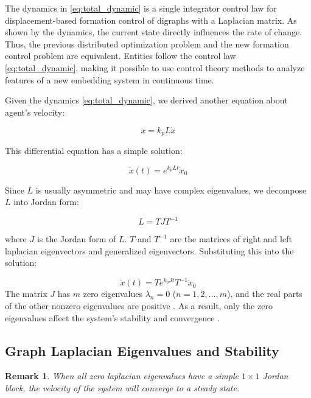 \documentclass[letterpaper, 10 pt, conference]{ieeeconf}  %
\newtheorem{remark}{Remark}
\begin{document}
The dynamics in \eqref{eq:total_dynamic} is a single integrator control law for displacement-based formation control of digraphs with a Laplacian matrix. As shown by the dynamics, the current state directly influences the rate of change. Thus, the previous distributed optimization problem and the new formation control problem are equivalent. Entities follow the control law \eqref{eq:total_dynamic}, making it possible to use control theory methods to analyze features of a new embedding system in continuous time.

Given the dynamics \eqref{eq:total_dynamic}, we derived another equation about agent's velocity:

\begin{equation}
    \ddot{x} = k_p L \dot{x}
    \label{eq:2dot}
\end{equation}

\noindent This differential equation has a simple solution:

\[ 
    \dot{x}(t) = e^{k_p Lt} \dot{x}_0 
\]

\noindent Since \( L \) is usually asymmetric and may have complex eigenvalues, we decompose \( L \) into Jordan form:

\[ 
    L = T J T^{-1} 
\]

\noindent where \( J \) is the Jordan form of \( L \). \( T \) and \(T^{-1}\) are the matrices of right and left laplacian eigenvectors and generalized eigenvectors. Substituting this into the solution:


\begin{equation}
    \dot{x}(t) = T e^{k_p J t} T^{-1} \dot{x}_0 
    \label{eq:jordan_decom}
\end{equation}
\noindent The matrix \( J \) has \( m \) zero eigenvalues \( \lambda_n = 0 \) (\( n = 1,2,...,m \)), and the real parts of the other nonzero eigenvalues are positive \cite{mirzaev_laplacian_2013}. As a result, only the zero eigenvalues affect the system's stability and convergence \cite{mesbahi_graph_2010}. 


\subsection{Graph Laplacian Eigenvalues and Stability}
\begin{remark}
    When all zero laplacian eigenvalues have a simple \(1 \times 1 \) Jordan block, the velocity of the system will converge to a steady state. 
\end{remark} 
\end{document}
